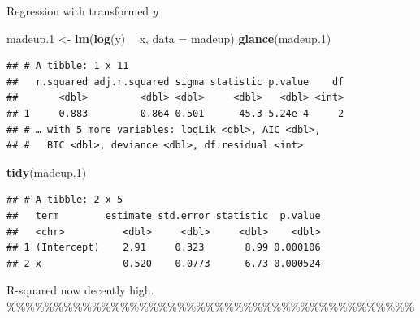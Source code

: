 \documentclass[ignorenonframetext,]{beamer}
\newenvironment{Shaded}{\begin{snugshade}}{\end{snugshade}}
\newcommand{\DataTypeTok}[1]{\textcolor[rgb]{0.13,0.29,0.53}{#1}}
\newcommand{\FloatTok}[1]{\textcolor[rgb]{0.00,0.00,0.81}{#1}}
\newcommand{\KeywordTok}[1]{\textcolor[rgb]{0.13,0.29,0.53}{\textbf{#1}}}
\newcommand{\NormalTok}[1]{#1}
\newcommand{\OperatorTok}[1]{\textcolor[rgb]{0.81,0.36,0.00}{\textbf{#1}}}
\newcommand{\StringTok}[1]{\textcolor[rgb]{0.31,0.60,0.02}{#1}}
\begin{document}
\begin{frame}[fragile]{Regression with transformed \(y\)}
\protect\hypertarget{regression-with-transformed-y}{}

\begin{Shaded}
\begin{Highlighting}[]
\NormalTok{madeup}\FloatTok{.1}\NormalTok{ <-}\StringTok{ }\KeywordTok{lm}\NormalTok{(}\KeywordTok{log}\NormalTok{(y) }\OperatorTok{~}\StringTok{ }\NormalTok{x, }\DataTypeTok{data =}\NormalTok{ madeup)}
\KeywordTok{glance}\NormalTok{(madeup}\FloatTok{.1}\NormalTok{)}
\end{Highlighting}
\end{Shaded}

\begin{verbatim}
## # A tibble: 1 x 11
##   r.squared adj.r.squared sigma statistic p.value    df
##       <dbl>         <dbl> <dbl>     <dbl>   <dbl> <int>
## 1     0.883         0.864 0.501      45.3 5.24e-4     2
## # … with 5 more variables: logLik <dbl>, AIC <dbl>,
## #   BIC <dbl>, deviance <dbl>, df.residual <int>
\end{verbatim}

\begin{Shaded}
\begin{Highlighting}[]
\KeywordTok{tidy}\NormalTok{(madeup}\FloatTok{.1}\NormalTok{)}
\end{Highlighting}
\end{Shaded}

\begin{verbatim}
## # A tibble: 2 x 5
##   term        estimate std.error statistic  p.value
##   <chr>          <dbl>     <dbl>     <dbl>    <dbl>
## 1 (Intercept)    2.91     0.323       8.99 0.000106
## 2 x              0.520    0.0773      6.73 0.000524
\end{verbatim}

R-squared now decently high.
\%\%\%\%\%\%\%\%\%\%\%\%\%\%\%\%\%\%\%\%\%\%\%\%\%\%\%\%\%\%\%\%\%\%\%\%\%\%\%\%\%\%\%

\end{frame}
\end{document}

